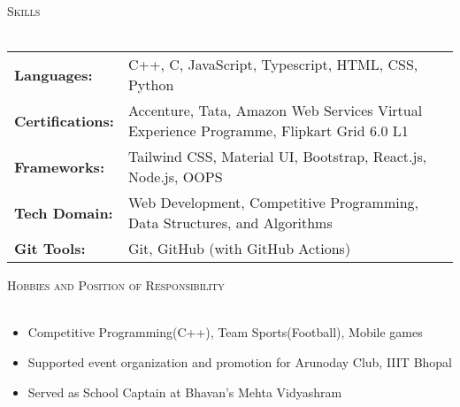 \documentclass[a4paper]{article}
\newcommand{\lineunder} {
    \vspace*{-8pt} \\
    \hspace*{-18pt} \hrulefill \\
}
\newcommand{\header} [1] {
    {\hspace*{-18pt}\vspace*{6pt} \textsc{#1}}
    \vspace*{-6pt} \lineunder
}
\begin{document}
\header{Skills}
\vspace{2mm}
\begin{tabular}{ l l }
    \textbf{Languages:} & C++, C, JavaScript, Typescript, HTML, CSS, Python \\
    \textbf{Certifications:} & Accenture, Tata, Amazon Web Services Virtual Experience Programme, Flipkart Grid 6.0 L1 \\
    \textbf{Frameworks:} & Tailwind CSS, Material UI, Bootstrap, React.js, Node.js, OOPS \\
    \textbf{Tech Domain:} & Web Development, Competitive Programming, Data Structures, and Algorithms \\
    \textbf{Git Tools:} & Git, GitHub (with GitHub Actions) \\
\end{tabular}



\vspace{2mm}
\header{Hobbies and Position of Responsibility}

\begin{itemize}
    \item Competitive Programming(C++), Team Sports(Football), Mobile games
    \item Supported event organization and promotion for Arunoday Club, IIIT Bhopal
    \item Served as School Captain at Bhavan’s Mehta Vidyashram
\end{itemize}
\end{document}

